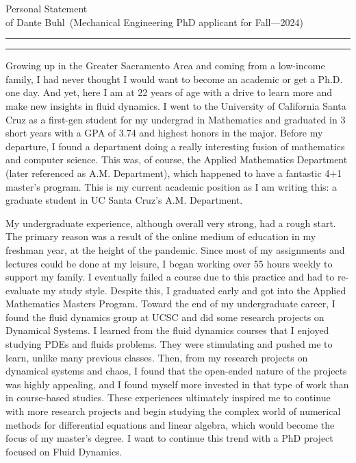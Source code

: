 \documentclass{article}
\newcommand{\soptitle}{Personal Statement}
\newcommand{\yourname}{Dante Buhl}
\begin{document}
\begin{center}\LARGE\soptitle\\
\large of \yourname\ (Mechanical Engineering PhD applicant for Fall---2024)
\end{center}

\hrule
\vspace{1pt}
\hrule height 1pt

\bigskip

\large
Growing up in the Greater Sacramento Area and coming from a low-income family, I had never thought I would want to become an academic or get a Ph.D. one day. And yet, here I am at 22 years of age with a drive to learn more and make new insights in fluid dynamics. I went to the University of California Santa Cruz as a first-gen student for my undergrad in Mathematics and graduated in 3 short years with a GPA of 3.74 and highest honors in the major. Before my departure, I found a department doing a really interesting fusion of mathematics and computer science. This was, of course, the Applied Mathematics Department (later referenced as A.M. Department), which happened to have a fantastic 4+1 master's program. This is my current academic position as I am writing this: a graduate student in UC Santa Cruz's A.M. Department. 

My undergraduate experience, although overall very strong, had a rough start. The primary reason was a result of the online medium of education in my freshman year, at the height of the pandemic. Since most of my assignments and lectures could be done at my leisure, I began working over 55 hours weekly to support my family. I eventually failed a course due to this practice and had to re-evaluate my study style. Despite this, I graduated early and got into the Applied Mathematics Masters Program. Toward the end of my undergraduate career, I found the fluid dynamics group at UCSC and did some research projects on Dynamical Systems. I learned from the fluid dynamics courses that I enjoyed studying PDEs and fluids problems. They were stimulating and pushed me to learn, unlike many previous classes. Then, from my research projects on dynamical systems and chaos, I found that the open-ended nature of the projects was highly appealing, and I found myself more invested in that type of work than in course-based studies. These experiences ultimately inspired me to continue with more research projects and begin studying the complex world of numerical methods for differential equations and linear algebra, which would become the focus of my master's degree. I want to continue this trend with a PhD project focused on Fluid Dynamics.
\end{document}
